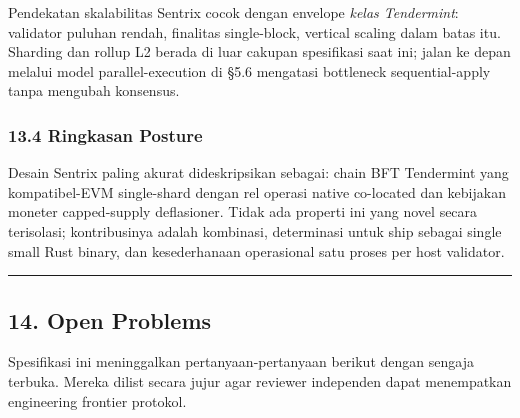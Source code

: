 \documentclass[11pt,a4paper]{article}
\begin{document}
Pendekatan skalabilitas Sentrix cocok dengan envelope \emph{kelas Tendermint}: validator puluhan rendah, finalitas single-block, vertical scaling dalam batas itu. Sharding dan rollup L2 berada di luar cakupan spesifikasi saat ini; jalan ke depan melalui model parallel-execution di §5.6 mengatasi bottleneck sequential-apply tanpa mengubah konsensus.

\hypertarget{ringkasan-posture}{%
\subsubsection{13.4 Ringkasan Posture}\label{ringkasan-posture}}

Desain Sentrix paling akurat dideskripsikan sebagai: chain BFT Tendermint yang kompatibel-EVM single-shard dengan rel operasi native co-located dan kebijakan moneter capped-supply deflasioner. Tidak ada properti ini yang novel secara terisolasi; kontribusinya adalah kombinasi, determinasi untuk ship sebagai single small Rust binary, dan kesederhanaan operasional satu proses per host validator.

\begin{center}\rule{0.5\linewidth}{0.5pt}\end{center}

\hypertarget{open-problems}{%
\subsection{14. Open Problems}\label{open-problems}}

Spesifikasi ini meninggalkan pertanyaan-pertanyaan berikut dengan sengaja terbuka. Mereka dilist secara jujur agar reviewer independen dapat menempatkan engineering frontier protokol.
\end{document}
